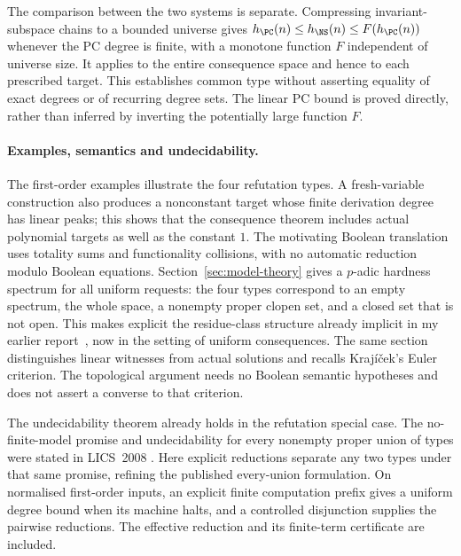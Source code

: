 The comparison between the two systems is separate. Compressing
invariant-subspace chains to a bounded universe gives
$h_{\PC}(n)\le h_{\NS}(n)\le F(h_{\PC}(n))$ whenever the PC
degree is finite, with a monotone function $F$ independent of
universe size. It applies to
the entire consequence space and hence to each prescribed target.
This establishes common type without asserting equality of exact
degrees or of recurring degree sets. The linear PC bound is proved
directly, rather than inferred by inverting the potentially large
function $F$.

\paragraph{Examples, semantics and undecidability.}
The first-order examples illustrate the four refutation types. A
fresh-variable construction also produces a nonconstant target
whose finite derivation degree has linear peaks; this shows that
the consequence theorem includes actual polynomial targets as well
as the constant $1$. The motivating Boolean translation uses
totality sums and functionality collisions, with no automatic
reduction modulo Boolean equations. Section~\ref{sec:model-theory} gives a $p$-adic hardness spectrum for
all uniform requests: the four types correspond to an empty spectrum,
the whole space, a nonempty proper clopen set, and a closed set that is
not open. This makes explicit the residue-class structure already
implicit in my earlier report~\cite[Section~4]{RiisLong}, now in the
setting of uniform consequences. The same section distinguishes
linear witnesses from actual solutions and recalls Kraj\'i\v cek's
Euler criterion. The topological argument needs no Boolean semantic
hypotheses and does not assert a converse to that criterion.

The undecidability theorem already holds in the refutation special
case. The no-finite-model promise and undecidability for every
nonempty proper union of types were stated in LICS~2008
\cite[Theorem~1]{Riis}. Here explicit reductions separate any two
types under that same promise, refining the published every-union
formulation. On normalised first-order inputs, an explicit finite
computation prefix gives a uniform degree bound when its machine
halts, and a controlled disjunction supplies the pairwise reductions.
The effective reduction and its finite-term certificate are included.

